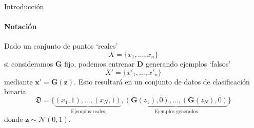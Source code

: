 \documentclass[aspectratio=169]{beamer}
\begin{document}
\begin{frame}[t]{Introducción}
\framesubtitle{Notación}	
	Dado un conjunto de puntos `reales' $$X=\{x_1,\ldots, x_n\}$$
	si consideramos $\textbf{G}$ fijo, podemos entrenar $\textbf{D}$ generando ejemplos `falsos' $$X'=\{x'_1,\ldots, x'_n\}$$
	mediante $\mathbf x'=\textbf{G}(\mathbf z)$. Esto resultará en un conjunto de datos de clasificación binaria $$\mathfrak{D}=\{ {\underbrace{(x_1,1), \dots, (x_N,1)}_{\text{Ejemplos reales}}}, {\underbrace{(\textbf{G}(z_1),0), \dots, (\textbf{G}(z_N),0)}_{\text{Ejemplos generados}}}\} $$
	donde $\mathbf z \sim \mathcal{N} (0, 1)$.

\end{frame}


\end{document}
